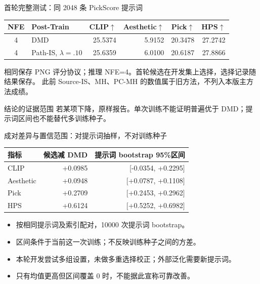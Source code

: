 \documentclass[10pt,aspectratio=169]{beamer}
\begin{document}
\begin{frame}{首轮完整测试：同 2048 条 PickScore 提示词}
\small\centering
\begin{tabular}{clrrrr}\toprule
NFE & Post-Train & CLIP$\uparrow$ & Aesthetic$\uparrow$ & Pick$\uparrow$ & HPS$\uparrow$\\\midrule
4 & DMD & 25.5374 & 5.9152 & 20.3478 & 27.2742 \\
4 & Path-IS, $\lambda=.10$ & 25.6359 & 6.0100 & 20.6187 & 27.8866 \\\bottomrule\end{tabular}
\par\raggedright\vspace{5pt}
相同保存 PNG 评分协议；推理 NFE=4。首轮候选在开发集上选择，选择记录随结果保存。
此前 Source-IS、MH、PC-MH 的数值属于旧方法，不列入本版主方法成绩。
\begin{alertblock}{结论的证据范围}
若某项下降，原样报告。单次训练不能证明普遍优于 DMD；提示词区间也不能替代多训练种子。
\end{alertblock}
\end{frame}
\begin{frame}{成对差异与置信范围：对提示词抽样，不对训练种子}
\small
\centering\begin{tabular}{lrr}\toprule 指标 & 候选减 DMD & 提示词 bootstrap 95\%区间\\\midrule
CLIP & +0.0985 & [-0.0354, +0.2295] \\
Aesthetic & +0.0948 & [+0.0787, +0.1108] \\
Pick & +0.2709 & [+0.2453, +0.2962] \\
HPS & +0.6124 & [+0.5252, +0.6982] \\
\bottomrule\end{tabular}\par\raggedright
\vspace{5pt}
\begin{itemize}\itemsep5pt
\item 按相同提示词及索引配对，10000 次提示词 bootstrap。
\item 区间条件于当前这一次训练；不反映训练种子之间的方差。
\item 本轮开发尝试多组设置，未做多重选择校正；外部泛化需要新提示词。
\item 只有均值更高但区间覆盖 0 时，不能据此宣称可靠改善。
\end{itemize}
\end{frame}
\end{document}
